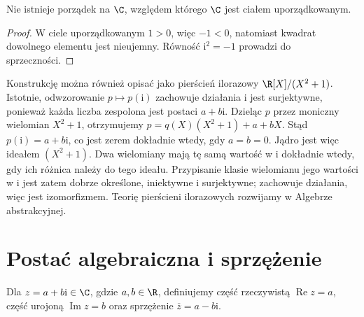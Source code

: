\begin{stwierdzenie}
\label{ma1:prop:complex-not-ordered}
Nie istnieje porządek na $\C$, względem którego $\C$ jest ciałem uporządkowanym.
\end{stwierdzenie}
\begin{proof}
W ciele uporządkowanym $1>0$, więc $-1<0$, natomiast kwadrat dowolnego elementu jest nieujemny. Równość $\mathrm i^2=-1$ prowadzi do sprzeczności.
\end{proof}

\begin{uwaga}
Konstrukcję można również opisać jako pierścień ilorazowy $\R[X]/(X^2+1)$. Istotnie, odwzorowanie $p\mapsto p(\mathrm i)$ zachowuje działania i jest surjektywne, ponieważ każda liczba zespolona jest postaci $a+b\mathrm i$. Dzieląc $p$ przez moniczny wielomian $X^2+1$, otrzymujemy $p=q(X)(X^2+1)+a+bX$. Stąd $p(\mathrm i)=a+b\mathrm i$, co jest zerem dokładnie wtedy, gdy $a=b=0$. Jądro jest więc ideałem $(X^2+1)$. Dwa wielomiany mają tę samą wartość w $\mathrm i$ dokładnie wtedy, gdy ich różnica należy do tego ideału. Przypisanie klasie wielomianu jego wartości w $\mathrm i$ jest zatem dobrze określone, iniektywne i surjektywne; zachowuje działania, więc jest izomorfizmem. Teorię pierścieni ilorazowych rozwijamy w Algebrze abstrakcyjnej.
\end{uwaga}

\section{Postać algebraiczna i sprzężenie}
\begin{definicja}
\label{ma1:def:complex-conjugation}
Dla $z=a+b\mathrm i\in\C$, gdzie $a,b\in\R$, definiujemy część rzeczywistą $\operatorname{Re}z=a$, część urojoną $\operatorname{Im}z=b$ oraz sprzężenie $\overline z=a-b\mathrm i$.
\end{definicja}

